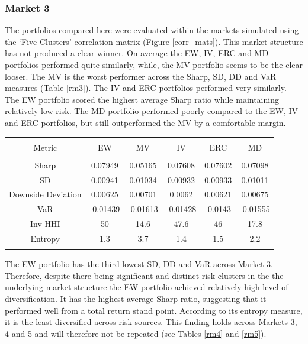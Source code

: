 \documentclass[11pt,preprint, authoryear]{elsarticle}
\let\origtable\table
\let\endorigtable\endtable
\renewenvironment{table}[1][2] {
    \expandafter\origtable\expandafter[H]
} {
    \endorigtable
}
\numberwithin{equation}{section}
\numberwithin{figure}{section}
\numberwithin{table}{section}
\begin{document}
\hypertarget{market-3}{%
\subsubsection{Market 3}\label{market-3}}

The portfolios compared here were evaluated within the markets simulated
using the `Five Clusters' correlation matrix (Figure \ref{corr_mats}).
This market structure has not produced a clear winner. On average the
EW, IV, ERC and MD portfolios performed quite similarly, while, the MV
portfolio seems to be the clear looser. The MV is the worst performer
across the Sharp, SD, DD and VaR measures (Table \ref{rm3}). The IV and
ERC portfolios performed very similarly. The EW portfolio scored the
highest average Sharp ratio while maintaining relatively low risk. The
MD portfolio performed poorly compared to the EW, IV and ERC portfolios,
but still outperformed the MV by a comfortable margin.

\begin{table}[!htbp] \centering 
  \caption{Market 3 - Portfolio Risk Metrics} 
  \label{rm3} 
\begin{tabular}{@{\extracolsep{5pt}} cccccc} 
\\[-1.8ex]\hline 
\hline \\[-1.8ex] 
Metric & EW & MV & IV & ERC & MD \\ 
\hline \\[-1.8ex] 
Sharp & 0.07949 & 0.05165 & 0.07608 & 0.07602 & 0.07098 \\ 
SD & 0.00941 & 0.01034 & 0.00932 & 0.00933 & 0.01011 \\ 
Downside Deviation & 0.00625 & 0.00701 & 0.0062 & 0.00621 & 0.00675 \\ 
VaR & -0.01439 & -0.01613 & -0.01428 & -0.0143 & -0.01555 \\ 
Inv HHI & 50 & 14.6 & 47.6 & 46 & 17.8 \\ 
Entropy & 1.3 & 3.7 & 1.4 & 1.5 & 2.2 \\ 
\hline \\[-1.8ex] 
\end{tabular} 
\end{table}

The EW portfolio has the third lowest SD, DD and VaR across Market 3.
Therefore, despite there being significant and distinct risk clusters in
the the underlying market structure the EW portfolio achieved relatively
high level of diversification. It has the highest average Sharp ratio,
suggesting that it performed well from a total return stand point.
According to its entropy measure, it is the least diversified across
risk sources. This finding holds across Markets 3, 4 and 5 and will
therefore not be repeated (see Tables \ref{rm4} and \ref{rm5}).
\end{document}
